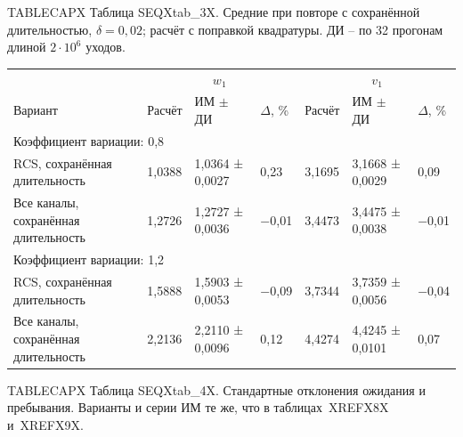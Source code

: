 \noindent TABLECAPX Таблица SEQXtab_3X. Средние при повторе с сохранённой длительностью, $\delta=0{,}02$; расчёт с поправкой квадратуры. ДИ -- по 32 прогонам длиной $2\cdot10^6$ уходов.\par

\setlength{\tabcolsep}{2pt}
\begin{tabular}{p{4.16cm}p{1.61cm}p{2.83cm}p{1.28cm}p{1.61cm}p{2.83cm}p{1.28cm}}
\toprule
 & \multicolumn{3}{c}{$w_1$} & \multicolumn{3}{c}{$v_1$} \\
Вариант & Расчёт & ИМ $\pm$ ДИ & $\Delta$, \% & Расчёт & ИМ $\pm$ ДИ & $\Delta$, \% \\
\midrule
\multicolumn{7}{l}{Коэффициент вариации: 0,8} \\
RCS, сохранённая длительность & 1,0388 & 1,0364 ± 0,0027 & 0,23 & 3,1695 & 3,1668 ± 0,0029 & 0,09 \\
Все каналы, сохранённая длительность & 1,2726 & 1,2727 ± 0,0036 & −0,01 & 3,4473 & 3,4475 ± 0,0038 & −0,01 \\
\multicolumn{7}{l}{Коэффициент вариации: 1,2} \\
RCS, сохранённая длительность & 1,5888 & 1,5903 ± 0,0053 & −0,09 & 3,7344 & 3,7359 ± 0,0056 & −0,04 \\
Все каналы, сохранённая длительность & 2,2136 & 2,2110 ± 0,0096 & 0,12 & 4,4274 & 4,4245 ± 0,0101 & 0,07 \\
\bottomrule
\end{tabular}




\noindent TABLECAPX Таблица SEQXtab_4X. Стандартные отклонения ожидания и пребывания. Варианты и серии ИМ те же, что в таблицах~XREFX8X и~XREFX9X.\par

